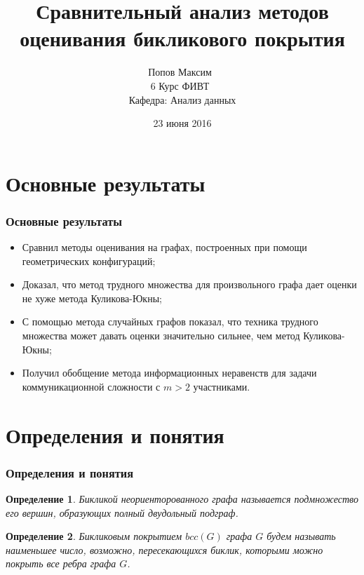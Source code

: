 \documentclass[utf8]{beamer}
\title{Сравнительный анализ методов оценивания бикликового покрытия}
\date{23 июня 2016}
\author{Попов Максим\ \\ 6 Курс ФИВТ\ \\ Кафедра: Анализ данных}
\newtheorem{mdefinition}{Определение}[section]
\begin{document}
    \begin{frame}
		\titlepage
	\end{frame}
	
	\section{Основные результаты}
	\begin{frame}
		\frametitle{Основные результаты}
		\begin{itemize}
		    \item[1)] Сравнил методы оценивания на графах, построенных при помощи геометрических конфигураций;
		    \item[2)] Доказал, что метод трудного множества для произвольного графа дает оценки не хуже 
		    метода Куликова-Юкны;
		    \item[3)] С помощью метода случайных графов показал, что техника трудного множества может 
		    давать оценки значительно сильнее, чем метод Куликова-Юкны;
		    \item[4)] Получил обобщение метода информационных неравенств для задачи коммуникационной 
		    сложности с $m > 2$ участниками.
		\end{itemize}
	\end{frame}
	
	\section{Определения и понятия}
	\begin{frame}
		\frametitle{Определения и понятия}
		\begin{mdefinition}
		    Бикликой неориенторованного графа называется подмножество его вершин, образующих полный 
		    двудольный подграф.
		\end{mdefinition}
		
		\begin{mdefinition}
		    Бикликовым покрытием $bcc(G)$ графа $G$ будем называть наименьшее число, возможно, пересекающихся
		    биклик, которыми можно покрыть все ребра графа $G$.
		\end{mdefinition}
	\end{frame}
	
\end{document}
